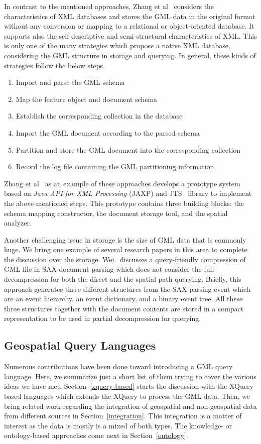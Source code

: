 \documentclass[a4paper,12pt]{article}
\begin{document}
In contrast to the mentioned approaches, Zhang et al~\cite{Zhang2008} considers the characteristics of XML databases and stores the GML data in the original format without any conversion or mapping to a relational or object-oriented database. 
It supports also the self-descriptive and semi-structural characteristics of XML.
This is only one of the many strategies which propose a native XML database, considering the GML structure in storage and querying. 
In general, these kinds of strategies follow the below steps,
\begin{enumerate}
\item Import and parse the GML schema
\item Map the feature object and document schema
\item Establish the corresponding collection in the database
\item Import the GML document according to the parsed schema
\item Partition and store the GML document into the corresponding collection
\item Record the log file containing the GML partitioning information
\end{enumerate}
Zhang et al~\cite{Zhang2008} as an example of these approaches develops a prototype system based on \textit{Java API for XML Processing} (JAXP) and JTS~\cite{jts} library to implement the above-mentioned steps. 
This prototype contains three building blocks: the schema mapping constructor, the document storage tool, 
and the spatial analyzer.

Another challenging issue in storage is the size of GML data that is commonly huge. 
We bring one example of several research papers in this area to complete the discussion over the storage.
Wei~\cite{Wei2011} discusses a query-friendly compression of GML file in SAX document 
parsing which does not consider the full decompression for both the direct and the spatial path querying. 
Briefly, this approach generates three different structures from the SAX parsing event
which are an event hierarchy, an event dictionary, and a binary event tree.
All these three structures together with the document contents are stored in a compact
representation to be used in partial decompression for querying.%

\subsection{Geospatial Query Languages}
\label{queryLang}
Numerous contributions have been done toward introducing a GML query language.
Here, we summarize just a short list of them trying to cover the various ideas we have met. %
Section~\ref{xquery-based} starts the discussion with the XQuery based languages which extends the XQuery
to process the GML data.
Then, we bring related work regarding the integration of geospatial and non-geospatial
data from different sources in Section~\ref{integration}. This integration is a matter of interest
as the data is mostly is a mixed of both types. The knowledge- or ontology-based approaches 
come next in Section~\ref{ontology}.
\end{document}
